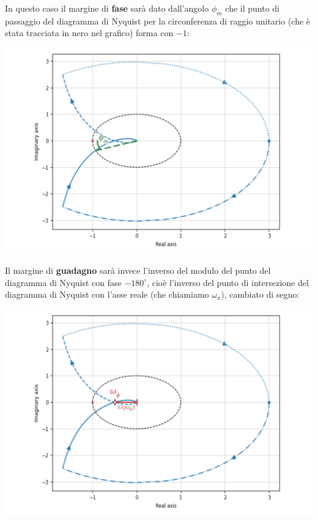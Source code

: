 \documentclass[a4paper,11pt]{article}
\begin{document}
\newpage

In questo caso il margine di \textbf{fase} sarà dato dall'angolo $\phi_m$ che il punto di passaggio del diagramma di Nyquist per la circonferenza di raggio unitario (che è stata tracciata in nero nel grafico) forma con $-1$:
\begin{center}
	\includegraphics[scale=0.35]{../figures/nyquist_phase_margin.png}
\end{center}

Il margine di \textbf{guadagno} sarà invece l'inverso del modulo del punto del diagramma di Nyquist con fase $-180^\circ$, cioè l'inverso del punto di intersezione del diagramma di Nyquist con l'asse reale (che chiamiamo $\omega_\pi$), cambiato di segno:
\begin{center}
	\includegraphics[scale=0.35]{../figures/nyquist_gain_margin.png}
\end{center}
\end{document}
